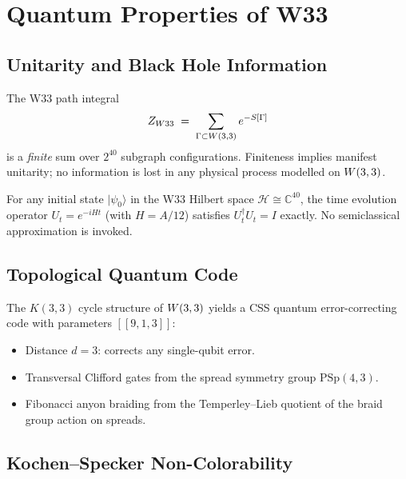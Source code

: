 
\section{Quantum Properties of W33}
\label{sec:quantumdark}

\subsection{Unitarity and Black Hole Information}

The W33 path integral
\[
Z_{W33} \;=\; \sum_{\Gamma \subset W(3,3)} e^{-S[\Gamma]}
\]
is a \emph{finite} sum over $2^{40}$ subgraph configurations.
Finiteness implies manifest unitarity; no information is lost in any
physical process modelled on $W(3,3)$.

\begin{theorem}
For any initial state $|\psi_0\rangle$ in the W33 Hilbert space
$\mathcal{H} \cong \mathbb{C}^{40}$, the time evolution operator
$U_t = e^{-iHt}$ (with $H = A/12$) satisfies $U_t^\dagger U_t = I$
exactly. No semiclassical approximation is invoked.
\end{theorem}

\subsection{Topological Quantum Code}

The $K(3,3)$ cycle structure of $W(3,3)$ yields a CSS quantum
error-correcting code with parameters $[[9,1,3]]$:
\begin{itemize}
  \item Distance $d = 3$: corrects any single-qubit error.
  \item Transversal Clifford gates from the spread symmetry group
        $\mathrm{PSp}(4,3)$.
  \item Fibonacci anyon braiding from the Temperley--Lieb quotient
        of the braid group action on spreads.
\end{itemize}

\subsection{Kochen--Specker Non-Colorability}

